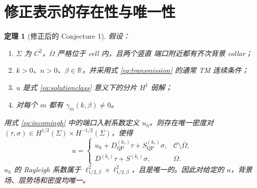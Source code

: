 \documentclass[UTF8,11pt,fontset=fandol]{ctexart}
\newcommand{\C}{\mathcal C}
\newcommand{\Om}{\Omega}
\newcommand{\Sig}{\Sigma}
\newcommand{\R}{\mathbb R}
\newcommand{\QP}{\mathrm{QP}}
\theoremstyle{plain}
\newtheorem{theorem}{定理}[section]
\theoremstyle{definition}
\theoremstyle{remark}
\begin{document}
\section{修正表示的存在性与唯一性}
\label{sec:corrected}

\begin{theorem}[修正后的 Conjecture 1]
\label{thm:corrected}
假设：
\begin{enumerate}[label=(\roman*)]
\item \(\Sig\) 为 \(C^2\)，\(\overline\Om\) 严格位于 cell 内，且两个竖直
端口附近都有齐次背景 collar；
\item \(k>0\)、\(n>0\)、\(\beta\in\R\)，并采用式
\eqref{eq:transmission} 的通常 TM 连续条件；
\item \(u\) 是式 \eqref{eq:solutionclass} 意义下的分片 \(H^1\) 弱解；
\item 对每个 \(m\) 都有 \(\gamma_m(k,\beta)\neq0\)。
\end{enumerate}
用式 \eqref{eq:incomingh} 中的端口入射系数定义 \(u_h\)。则存在唯一密度对
\((\tau,\sigma)\in H^{1/2}(\Sig)\times H^{-1/2}(\Sig)\)，使得
\begin{equation}
u=\begin{cases}
u_h+D_{\QP}^{(k_e)}\tau+S_{\QP}^{(k_e)}\sigma,
&\C\setminus\overline\Om,\\
D^{(k_i)}\tau+S^{(k_i)}\sigma,&\Om.
\end{cases}
\label{eq:correctedrep}
\end{equation}
\(u_h\) 的 Rayleigh 系数属于
\(\ell^2_{1/2,\beta}\times\ell^2_{1/2,\beta}\)，且是唯一的。因此对给定的
\(u\)，背景场、层势场和密度均唯一。
\end{theorem}
\end{document}
